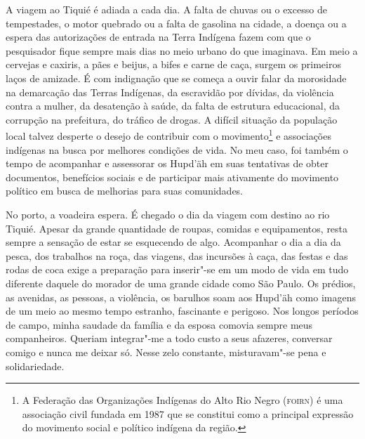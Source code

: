 
A viagem ao Tiquié é adiada a cada dia. A falta de chuvas ou o excesso
de tempestades, o motor quebrado ou a falta de gasolina na cidade, a
doença ou a espera das autorizações de entrada na Terra Indígena fazem
com que o pesquisador fique sempre mais dias no meio urbano do que
imaginava. Em meio a cervejas e caxiris, a pães e beijus, a bifes e
carne de caça, surgem os primeiros laços de amizade. É com indignação
que se começa a ouvir falar da morosidade na demarcação das Terras
Indígenas, da escravidão por dívidas, da violência contra a mulher, da
desatenção à saúde, da falta de estrutura educacional, da corrupção na
prefeitura, do tráfico de drogas. A difícil situação da população local
talvez desperte o desejo de contribuir com o movimento\footnote{A
  Federação das Organizações Indígenas do Alto Rio Negro ({\textsc{foirn}}) é uma
  associação civil fundada em 1987 que se constitui como a principal
  expressão do movimento social e político indígena da região.} e
associações indígenas na busca por melhores condições de vida. No meu
caso, foi também o tempo de acompanhar e assessorar os Hupd'äh em suas
tentativas de obter documentos, benefícios sociais e de participar mais
ativamente do movimento político em busca de melhorias para suas
comunidades.

No porto, a voadeira espera. É chegado o dia da viagem com destino ao
rio Tiquié. Apesar da grande quantidade de roupas, comidas e
equipamentos, resta sempre a sensação de estar se esquecendo de algo.
Acompanhar o dia a dia da pesca, dos trabalhos na roça, das viagens, das
incursões à caça, das festas e das rodas de coca exige a preparação para
inserir"-se em um modo de vida em tudo diferente daquele do morador de
uma grande cidade como São Paulo. Os prédios, as avenidas, as pessoas, a
violência, os barulhos soam aos Hupd'äh como imagens de um meio ao mesmo
tempo estranho, fascinante e perigoso. Nos longos períodos de campo,
minha saudade da família e da esposa comovia sempre meus companheiros.
Queriam integrar"-me a todo custo a seus afazeres, conversar comigo e
nunca me deixar só. Nesse zelo constante, misturavam"-se pena e
solidariedade.

